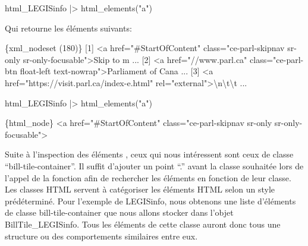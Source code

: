 \documentclass[
  letterpaper,
  DIV=11,
  numbers=noendperiod]{scrreprt}
\newenvironment{Shaded}{\begin{snugshade}}{\end{snugshade}}
\newcommand{\DataTypeTok}[1]{\textcolor[rgb]{0.68,0.00,0.00}{#1}}
\newcommand{\ErrorTok}[1]{\textcolor[rgb]{0.68,0.00,0.00}{#1}}
\newcommand{\ExtensionTok}[1]{\textcolor[rgb]{0.00,0.23,0.31}{#1}}
\newcommand{\KeywordTok}[1]{\textcolor[rgb]{0.00,0.23,0.31}{#1}}
\newcommand{\NormalTok}[1]{\textcolor[rgb]{0.00,0.23,0.31}{#1}}
\newcommand{\OperatorTok}[1]{\textcolor[rgb]{0.37,0.37,0.37}{#1}}
\newcommand{\StringTok}[1]{\textcolor[rgb]{0.13,0.47,0.30}{#1}}
\newcommand{\VariableTok}[1]{\textcolor[rgb]{0.07,0.07,0.07}{#1}}
\begin{document}
\begin{Shaded}
\begin{Highlighting}[]
\ExtensionTok{html\_LEGISinfo} \KeywordTok{|}\OperatorTok{\textgreater{}}\NormalTok{ html\_elements}\KeywordTok{(}\StringTok{"a"}\KeywordTok{)}
\end{Highlighting}
\end{Shaded}

Qui retourne les éléments suivants:

\begin{Shaded}
\begin{Highlighting}[]
\ExtensionTok{\{xml\_nodeset} \ErrorTok{(}\ExtensionTok{180}\KeywordTok{)}\ErrorTok{\}}
 \ExtensionTok{[1]} \OperatorTok{\textless{}}\NormalTok{a href=}\StringTok{"\#StartOfContent"}\NormalTok{ class=}\StringTok{"ce{-}parl{-}skipnav sr{-}only sr{-}only{-}focusable"}\OperatorTok{\textgreater{}}\NormalTok{Skip to m ...}
 \ExtensionTok{[2]} \OperatorTok{\textless{}}\NormalTok{a href=}\StringTok{"//www.parl.ca"}\NormalTok{ class=}\StringTok{"ce{-}parl{-}btn float{-}left text{-}nowrap"}\OperatorTok{\textgreater{}}\NormalTok{Parliament of Cana ...}
 \ExtensionTok{[3]} \OperatorTok{\textless{}}\NormalTok{a href=}\StringTok{"https://visit.parl.ca/index{-}e.html"}\NormalTok{ rel=}\StringTok{"external"}\OperatorTok{\textgreater{}}\DataTypeTok{\textbackslash{}n\textbackslash{}t\textbackslash{}t}\NormalTok{                    ...}
\end{Highlighting}
\end{Shaded}

\begin{Shaded}
\begin{Highlighting}[]
\ExtensionTok{html\_LEGISinfo} \KeywordTok{|}\OperatorTok{\textgreater{}}\NormalTok{ html\_elements}\KeywordTok{(}\StringTok{"a"}\KeywordTok{)}
\end{Highlighting}
\end{Shaded}

\begin{Shaded}
\begin{Highlighting}[]
\ExtensionTok{\{html\_node\}}
\OperatorTok{\textless{}}\NormalTok{a }\VariableTok{href}\OperatorTok{=}\StringTok{"\#StartOfContent"} \VariableTok{class}\OperatorTok{=}\StringTok{"ce{-}parl{-}skipnav sr{-}only sr{-}only{-}focusable"}\OperatorTok{\textgreater{}}
\end{Highlighting}
\end{Shaded}

Suite à l'inspection des éléments , ceux qui nous intéressent sont ceux
de classe ``bill-tile-container''. Il suffit d'ajouter un point ``.''
avant la classe souhaitée lors de l'appel de la fonction afin de
rechercher les éléments en fonction de leur classe. Les classes HTML
servent à catégoriser les éléments HTML selon un style prédéterminé.
Pour l'exemple de LEGISinfo, nous obtenons une liste d'éléments de
classe bill-tile-container que nous allons stocker dans l'objet
BillTile\_LEGISinfo. Tous les éléments de cette classe auront donc tous
une structure ou des comportements similaires entre eux.
\end{document}
